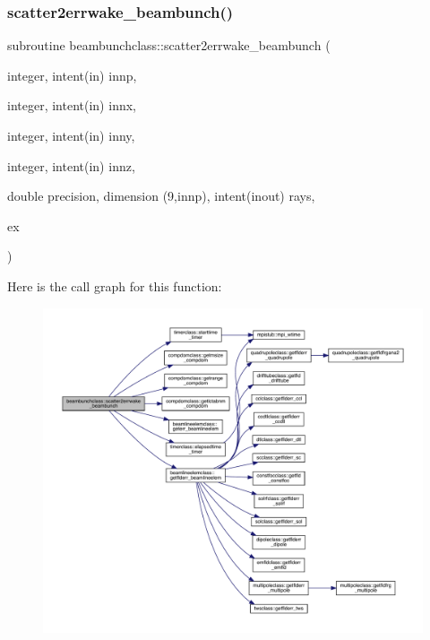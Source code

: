 \subsubsection{\texorpdfstring{scatter2errwake\_beambunch()}{scatter2errwake\_beambunch()}}
{\footnotesize\ttfamily subroutine beambunchclass\+::scatter2errwake\+\_\+beambunch (\begin{DoxyParamCaption}\item[{integer, intent(in)}]{innp,  }\item[{integer, intent(in)}]{innx,  }\item[{integer, intent(in)}]{inny,  }\item[{integer, intent(in)}]{innz,  }\item[{double precision, dimension (9,innp), intent(inout)}]{rays,  }\item[{}]{ex }\end{DoxyParamCaption})}

Here is the call graph for this function\+:\nopagebreak
\begin{figure}[H]
\begin{center}
\leavevmode
\includegraphics[width=350pt]{namespacebeambunchclass_a2395bc91f4fc52175d8a5cc92890bb83_cgraph}
\end{center}
\end{figure}
\mbox{\label{namespacebeambunchclass_aa17d706a08d23a054bf547514e796e6a}} 
